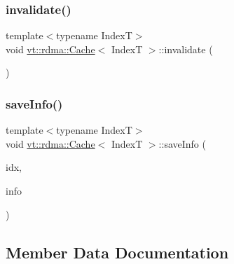 \mbox{\label{structvt_1_1rdma_1_1_cache_a855d0107608982399063f2ad1760862b}} 
\subsubsection{\texorpdfstring{invalidate()}{invalidate()}}
{\footnotesize\ttfamily template$<$typename IndexT$>$ \\
void \hyperlink{structvt_1_1rdma_1_1_cache}{vt\+::rdma\+::\+Cache}$<$ IndexT $>$\+::invalidate (\begin{DoxyParamCaption}{ }\end{DoxyParamCaption})\hspace{0.3cm}{\ttfamily [inline]}}

\mbox{\label{structvt_1_1rdma_1_1_cache_ab8f9bc1877a3be2f277e7280f3db1075}} 
\subsubsection{\texorpdfstring{save\+Info()}{saveInfo()}}
{\footnotesize\ttfamily template$<$typename IndexT$>$ \\
void \hyperlink{structvt_1_1rdma_1_1_cache}{vt\+::rdma\+::\+Cache}$<$ IndexT $>$\+::save\+Info (\begin{DoxyParamCaption}\item[{IndexT const \&}]{idx,  }\item[{\hyperlink{structvt_1_1rdma_1_1_index_info}{Index\+Info}}]{info }\end{DoxyParamCaption})\hspace{0.3cm}{\ttfamily [inline]}}



\subsection{Member Data Documentation}
\mbox{\label{structvt_1_1rdma_1_1_cache_ac1c54dca76c586ed12f9d52acd2cbd32}} 
